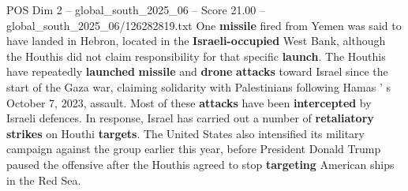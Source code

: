 \begin{textsample}{POS Dim 2 – global\_south\_2025\_06 – Score 21.00 – global\_south\_2025\_06/126282819.txt}
One \textbf{missile} fired from Yemen was said to have landed in Hebron, located in the \textbf{Israeli-occupied} West Bank, although the Houthis did not claim responsibility for that specific \textbf{launch}.
The Houthis have repeatedly \textbf{launched} \textbf{missile} and \textbf{drone} \textbf{attacks} toward Israel since the start of the Gaza war, claiming solidarity with Palestinians following Hamas ' s October 7, 2023, assault.
Most of these \textbf{attacks} have been \textbf{intercepted} by Israeli defences.
In response, Israel has carried out a number of \textbf{retaliatory} \textbf{strikes} on Houthi \textbf{targets}.
The United States also intensified its military campaign against the group earlier this year, before President Donald Trump paused the offensive after the Houthis agreed to stop \textbf{targeting} American ships in the Red Sea.

\end{textsample}
